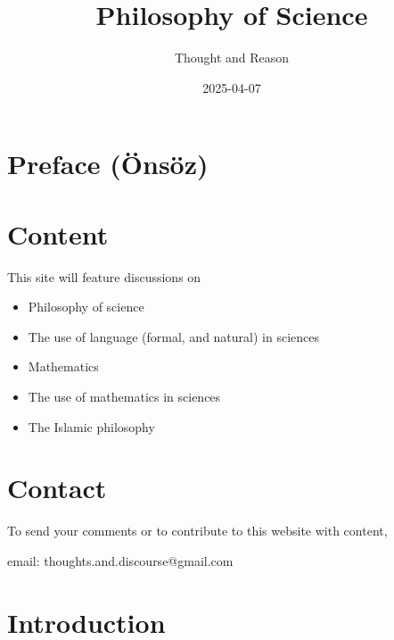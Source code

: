 \documentclass[
  letterpaper,
  DIV=11,
  numbers=noendperiod]{scrreprt}
\title{Philosophy of Science}
\author{Thought and Reason}
\date{2025-04-07}
\providecommand{\tightlist}{%
  \setlength{\itemsep}{0pt}\setlength{\parskip}{0pt}}\usepackage{longtable,booktabs,array}
\renewcommand*\contentsname{Table of contents}
\newcommand\contentsname{Table of contents}
\begin{document}
\maketitle

\renewcommand*\contentsname{Table of contents}
{
\hypersetup{linkcolor=}
\setcounter{tocdepth}{2}
\tableofcontents
}


\chapter*{Preface (Önsöz)}\label{preface-uxf6nsuxf6z}



\chapter*{Content}\label{content}


This site will feature discussions on

\begin{itemize}
\tightlist
\item
  Philosophy of science
\item
  The use of language (formal, and natural) in sciences
\item
  Mathematics
\item
  The use of mathematics in sciences
\item
  The Islamic philosophy
\end{itemize}


\chapter*{Contact}\label{contact}


To send your comments or to contribute to this website with content,

email: thoughts.and.discourse@gmail.com


\chapter{Introduction}\label{introduction}
\end{document}
